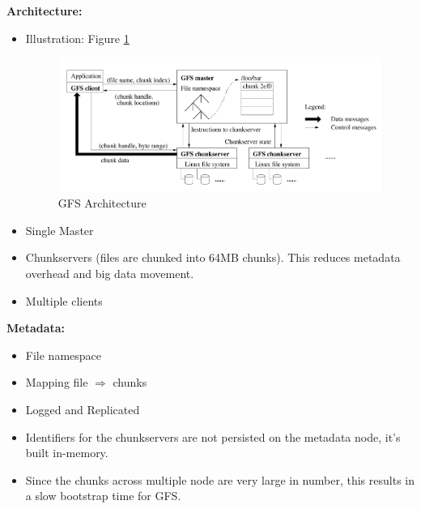 \documentclass[parskip=half]{scrartcl}
\begin{document}
    \textbf{Architecture:}
    \begin{itemize}
        \item 
        Illustration: Figure \ref{fig:gfs-architecture}
        \begin{figure}[ht]
            \centering
            \includegraphics[width=.8\textwidth]{gfs-architecture}
            \caption{GFS Architecture}
            \label{fig:gfs-architecture}
        \end{figure}
        \item 
        Single Master
        \item 
        Chunkservers (files are chunked into 64MB chunks). This reduces metadata overhead and big data movement.
        \item 
        Multiple clients
    \end{itemize}

    \textbf{Metadata:}
    \begin{itemize}
        \item 
        File namespace
        \item 
        Mapping file $\Rightarrow$ chunks
        \item 
        Logged and Replicated
        \item 
        Identifiers for the chunkservers are not persisted on the metadata node, it's built in-memory.
        \item 
        Since the chunks across multiple node are very large in number, this results in a slow bootstrap time for GFS.
    \end{itemize}
\end{document}
